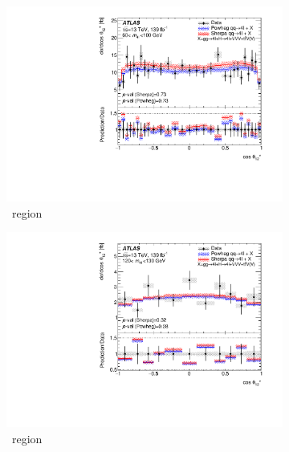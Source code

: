 \begin{figure}[H]
    \begin{subfigure}{.49\textwidth}\centering
      \includegraphics[width=.95\linewidth]{Figures/m4l/UnfoldedResults/linY_Unfolded_Data_cosThetaStar1_m4l60-100.pdf}\caption{\ZFourL \ region}\label{fig:sub-first}
    \end{subfigure}
    \begin{subfigure}{.49\textwidth}\centering
      \includegraphics[width=.95\linewidth]{Figures/m4l/UnfoldedResults/linY_Unfolded_Data_cosThetaStar1_m4l120-130.pdf} \caption{\HFourL \ region}\label{fig:sub-second}
    \end{subfigure}
    \begin{subfigure}{.49\textwidth}\centering

\end{subfigure}
\end{figure}
